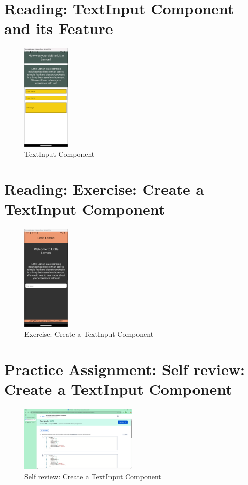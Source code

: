 \section{Reading: TextInput Component and its Feature}
\begin{figure}[H]
    \centering
    \includegraphics[width=0.2\textwidth]{images/ex4.png}
    \caption{TextInput Component}
\end{figure}

\section{Reading: Exercise: Create a TextInput Component}
\begin{figure}[H]
    \centering
    \includegraphics[width=0.2\textwidth]{images/Ex4 (2).png}
    \caption{Exercise: Create a TextInput Component}
\end{figure}

\section{Practice Assignment: Self review: Create a TextInput Component}
\begin{figure}[H]
    \centering
    \includegraphics[width=0.5\textwidth]{images/sr-3.png}
    \caption{Self review: Create a TextInput Component}
\end{figure}

